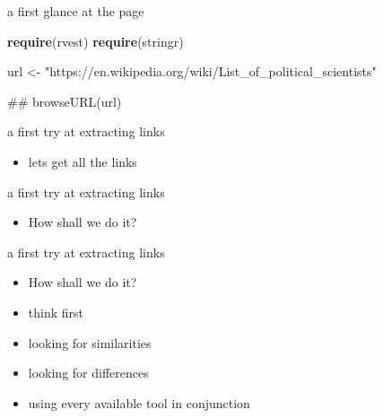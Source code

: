 \documentclass[ignorenonframetext,]{beamer}
\newenvironment{Shaded}{\begin{snugshade}}{\end{snugshade}}
\newcommand{\KeywordTok}[1]{\textcolor[rgb]{0.13,0.29,0.53}{\textbf{{#1}}}}
\newcommand{\StringTok}[1]{\textcolor[rgb]{0.31,0.60,0.02}{{#1}}}
\newcommand{\NormalTok}[1]{{#1}}
\providecommand{\tightlist}{%
  \setlength{\itemsep}{0pt}\setlength{\parskip}{0pt}}
\begin{document}
\begin{frame}[fragile]{a first glance at the page}

\begin{Shaded}
\begin{Highlighting}[]
\KeywordTok{require}\NormalTok{(rvest)}
\KeywordTok{require}\NormalTok{(stringr)}
\end{Highlighting}
\end{Shaded}

\begin{Shaded}
\begin{Highlighting}[]
\NormalTok{url <-}\StringTok{ }
\StringTok{"https://en.wikipedia.org/wiki/List_of_political_scientists"}

\NormalTok{## browseURL(url)}
\end{Highlighting}
\end{Shaded}

\end{frame}

\begin{frame}{a first try at extracting links}

\begin{itemize}
\tightlist
\item
  lets get all the links
\end{itemize}

\end{frame}

\begin{frame}{a first try at extracting links}

\begin{itemize}
\tightlist
\item
  How shall we do it?
\end{itemize}

\end{frame}

\begin{frame}{a first try at extracting links}

\begin{itemize}
\item
  How shall we do it?
\item
  think first
\item
  looking for similarities
\item
  looking for differences
\item
  using every available tool in conjunction
\end{itemize}

\end{frame}
\end{document}
